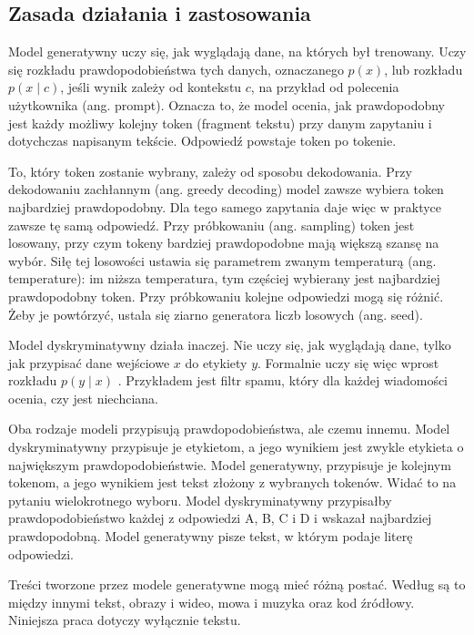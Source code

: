 \subsection{Zasada działania i zastosowania}

Model generatywny uczy się, jak wyglądają dane, na których był trenowany. Uczy się rozkładu prawdopodobieństwa tych danych, oznaczanego $p(x)$, lub rozkładu $p(x \mid c)$, jeśli wynik zależy od kontekstu $c$, na przykład od polecenia użytkownika (ang. prompt). Oznacza to, że model ocenia, jak prawdopodobny jest każdy możliwy kolejny token (fragment tekstu) przy danym zapytaniu i dotychczas napisanym tekście. Odpowiedź powstaje token po tokenie.

To, który token zostanie wybrany, zależy od sposobu dekodowania. Przy dekodowaniu zachłannym (ang. greedy decoding) model zawsze wybiera token najbardziej prawdopodobny. Dla tego samego zapytania daje więc w praktyce zawsze tę samą odpowiedź. Przy próbkowaniu (ang. sampling) token jest losowany, przy czym tokeny bardziej prawdopodobne mają większą szansę na wybór. Siłę tej losowości ustawia się parametrem zwanym temperaturą (ang. temperature): im niższa temperatura, tym częściej wybierany jest najbardziej prawdopodobny token. Przy próbkowaniu kolejne odpowiedzi mogą się różnić. Żeby je powtórzyć, ustala się ziarno generatora liczb losowych (ang. seed).

Model dyskryminatywny działa inaczej. Nie uczy się, jak wyglądają dane, tylko jak przypisać dane wejściowe $x$ do etykiety $y$. Formalnie uczy się więc wprost rozkładu $p(y \mid x)$ \cite{ng_jordan_discriminative_generative}. Przykładem jest filtr spamu, który dla każdej wiadomości ocenia, czy jest niechciana.

Oba rodzaje modeli przypisują prawdopodobieństwa, ale czemu innemu. Model dyskryminatywny przypisuje je etykietom, a jego wynikiem jest zwykle etykieta o największym prawdopodobieństwie. Model generatywny, przypisuje je kolejnym tokenom, a jego wynikiem jest tekst złożony z wybranych tokenów. Widać to na pytaniu wielokrotnego wyboru. Model dyskryminatywny przypisałby prawdopodobieństwo każdej z odpowiedzi A, B, C i D i wskazał najbardziej prawdopodobną. Model generatywny pisze tekst, w którym podaje literę odpowiedzi.

Treści tworzone przez modele generatywne mogą mieć różną postać. Według \cite{feuerriegel_generative_ai} są to między innymi tekst, obrazy i wideo, mowa i muzyka oraz kod źródłowy. Niniejsza praca dotyczy wyłącznie tekstu.

